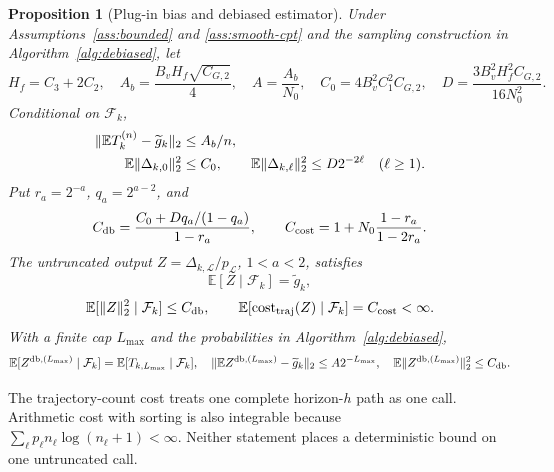 \documentclass[11pt]{article}
\newtheorem{proposition}[theorem]{Proposition}
\newcommand{\E}{\mathbb E}
\newcommand{\1}{\mathbf 1}
\DeclarePairedDelimiter{\norm}{\lVert}{\rVert}
\newcommand{\cF}{\mathcal F}
\newcommand{\eps}{\varepsilon}
\newcommand{\db}{\mathrm{db}}
\begin{document}
\begin{proposition}[Plug-in bias and debiased estimator]\label{prop:debias}
Under Assumptions~\ref{ass:bounded} and \ref{ass:smooth-cpt} and the sampling construction in Algorithm~\ref{alg:debiased}, let
\[
 H_f=C_3+2C_2,\quad A_b=\frac{B_vH_f\sqrt{C_{G,2}}}4,\quad
 A=\frac{A_b}{N_0},\quad C_0=4B_v^2C_1^2C_{G,2},\quad
 D=\frac{3B_v^2H_f^2C_{G,2}}{16N_0^2}.
\]
Conditional on $\cF_k$,
\begin{align}
 \norm{\E T_k^{(n)}-\widetilde g_k}_2&\le A_b/n,\label{eq:plugin-bias}\\
 \E\norm{\Delta_{k,0}}_2^2&\le C_0,\qquad
 \E\norm{\Delta_{k,\ell}}_2^2\le D2^{-2\ell}\quad(\ell\ge1).
 \label{eq:level-second-moment}
\end{align}
Put $r_a=2^{-a}$, $q_a=2^{a-2}$, and
\begin{equation}\label{eq:uniform-db-constant}
 C_{\db}=\frac{C_0+Dq_a/(1-q_a)}{1-r_a},\qquad
 C_{\rm cost}=1+N_0\frac{1-r_a}{1-2r_a}.
\end{equation}
The untruncated output $Z=\Delta_{k,\mathcal L}/p_{\mathcal L}$, $1<a<2$, satisfies
\begin{equation}\label{eq:db-unbiased}
 \E[Z\mid\cF_k]=\widetilde g_k,
\end{equation}
\begin{equation}\label{eq:db-second-moment}
 \E[\norm{Z}_2^2\mid\cF_k]\le C_{\db},\qquad
 \E[\operatorname{cost}_{\rm traj}(Z)\mid\cF_k]=C_{\rm cost}<\infty.
\end{equation}
With a finite cap $L_{\max}$ and the probabilities in Algorithm~\ref{alg:debiased},
\begin{equation}\label{eq:cap-bias}
 \E[Z^{\db,(L_{\max})}\mid\cF_k]=\E[T_{k,L_{\max}}\mid\cF_k],\quad
 \norm{\E Z^{\db,(L_{\max})}-\widetilde g_k}_2\le A2^{-L_{\max}},\quad
 \E\norm{Z^{\db,(L_{\max})}}_2^2\le C_{\db}.
\end{equation}
\end{proposition}
The trajectory-count cost treats one complete horizon-$h$ path as one call. Arithmetic cost with sorting is also integrable because $\sum_\ell p_\ell n_\ell\log(n_\ell+1)<\infty$. Neither statement places a deterministic bound on one untruncated call.
\end{document}
